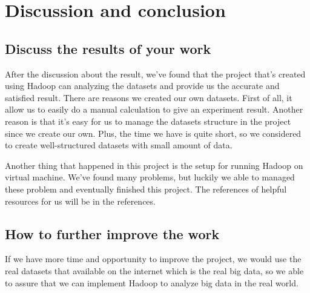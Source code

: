 \documentclass[11pt]{article}
\begin{document}
\newpage
\section{Discussion and conclusion}\label{sec:dis}
\subsection{Discuss the results of your work}
After the discussion about the result, we've found that the project that's created using Hadoop can analyzing the datasets and provide us the accurate and satisfied result. There are reasons we created our own datasets. First of all, it allow us to easily do a manual calculation to give an experiment result. Another reason is that it's easy for us to manage the datasets structure in the project since we create our own. Plus, the time we have is quite short, so we considered to create well-structured datasets with small amount of data.

Another thing that happened in this project is the setup for running Hadoop on virtual machine. We've found many problems, but luckily we able to managed these problem and eventually finished this project. The references of helpful resources for us will be in the references\cite{luc}\cite{mun}\cite{boh}\cite{sau}.
\subsection{How to further improve the work}
If we have more time and opportunity to improve the project, we would use the real datasets that available on the internet which is the real big data, so we able to assure that we can implement Hadoop to analyze big data in the real world.
\end{document}
